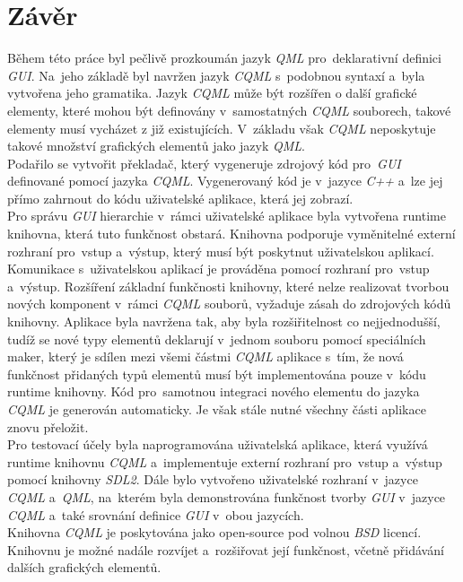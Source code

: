 \documentclass[11pt,twoside,a4paper]{book}
\begin{document}
\section{Závěr}
Během této práce byl pečlivě prozkoumán jazyk \textit{QML} pro~deklarativní definici \textit{GUI}. Na~jeho základě byl navržen jazyk \textit{CQML} s~podobnou syntaxí a~byla vytvořena jeho gramatika. Jazyk \textit{CQML} může být rozšířen o další grafické elementy, které mohou být definovány v~samostatných \textit{CQML} souborech, takové elementy musí vycházet z již existujících. V~základu však \textit{CQML} neposkytuje takové množství grafických elementů jako jazyk \textit{QML}.\\
Podařilo se vytvořit překladač, který vygeneruje zdrojový kód pro~\textit{GUI} definované pomocí jazyka \textit{CQML}. Vygenerovaný kód je v~jazyce \textit{C++} a~lze jej přímo zahrnout do kódu uživatelské aplikace, která jej zobrazí.\\
Pro správu \textit{GUI} hierarchie v~rámci uživatelské aplikace byla vytvořena runtime knihovna, která tuto funkčnost obstará. Knihovna podporuje vyměnitelné externí rozhraní pro~vstup a~výstup, který musí být poskytnut uživatelskou aplikací. Komunikace s~uživatelskou aplikací je prováděna pomocí rozhraní pro~vstup a~výstup. 
Rozšíření základní funkčnosti knihovny, které nelze realizovat tvorbou nových komponent v~rámci \textit{CQML} souborů, vyžaduje zásah do zdrojových kódů knihovny. Aplikace byla navržena tak, aby byla rozšiřitelnost co nejjednodušší, tudíž se nové typy elementů deklarují v~jednom souboru pomocí speciálních maker, který je sdílen mezi všemi částmi \textit{CQML} aplikace s~tím, že nová funkčnost přidaných typů elementů musí být implementována pouze v~kódu runtime knihovny. Kód pro~samotnou integraci nového elementu do jazyka \textit{CQML} je generován automaticky. Je však stále nutné všechny části aplikace znovu přeložit.\\
Pro testovací účely byla naprogramována uživatelská aplikace, která využívá runtime knihovnu \textit{CQML} a~implementuje externí rozhraní pro~vstup a~výstup pomocí knihovny \textit{SDL2}. Dále bylo vytvořeno uživatelské rozhraní v~jazyce \textit{CQML} a~\textit{QML}, na~kterém byla demonstrována funkčnost tvorby \textit{GUI} v~jazyce \textit{CQML} a~také srovnání definice \textit{GUI} v~obou jazycích.\\
Knihovna \textit{CQML} je poskytována jako open-source pod volnou \textit{BSD} licencí. Knihovnu je možné nadále rozvíjet a~rozšiřovat její funkčnost, včetně přidávání dalších grafických elementů.
\end{document}

